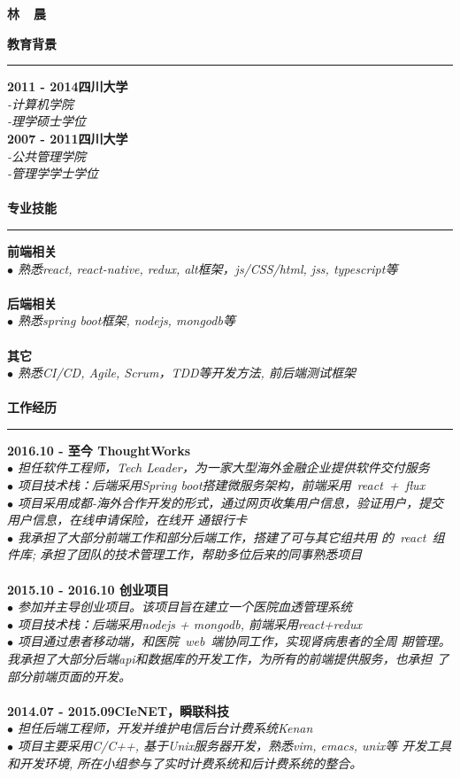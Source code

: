 \documentclass[a4paper,12pt,final]{memoir}
\newcommand{\myThemeColor}{RoyalBlue}
\newcommand{\SmallSep}{\vspace{0.9em}}
\newcommand{\CVSection}[1]
	{\Large\textbf{#1}\par
	\vspace{0.2cm}\normalsize\normalfont}
\newcommand{\CVItem}[1]
	{\textbf{\color{\myThemeColor} #1}}
\begin{document}
\begin{CJK*}{UTF8}{gbsn}
\Huge\bfseries {\color{\myThemeColor} 林~~晨}\\
\normalsize\normalfont

\CVSection{教育背景}
\hrule
\SmallSep
\CVItem{2011 - 2014\hfill\textsc{四川大学}}\\
\textit{-计算机学院}\\
\textit{-理学硕士学位}
\\
\CVItem{2007 - 2011\hfill\textsc{四川大学}}\\
\textit{-公共管理学院}\\
\textit{-管理学学士学位}\\
\\
\CVSection{专业技能}
\hrule
\SmallSep
\CVItem{前端相关}\\
\textit{$\bullet$ 熟悉react, react-native, redux, alt框架，js/CSS/html, jss, typescript等} \\
\\
\CVItem{后端相关}\\
\textit{$\bullet$ 熟悉spring boot框架, nodejs, mongodb等 } \\
\\
\CVItem{其它}\\
\textit{$\bullet$ 熟悉CI/CD, Agile, Scrum，TDD等开发方法, 前后端测试框架 }\\
\\

\CVSection{工作经历}
\hrule
\SmallSep
\CVItem{2016.10 - 至今 \hfill ThoughtWorks}\\
\textit{$\bullet$ 担任软件工程师，Tech Leader，为一家大型海外金融企业提供软件交付服务} \\
\textit{$\bullet$ 项目技术栈：后端采用Spring boot搭建微服务架构，前端采用~react~+~flux~} \\
\textit{$\bullet$ 项目采用成都-海外合作开发的形式，通过网页收集用户信息，验证用户，提交用户信息，在线申请保险，在线开
  通银行卡}\\
\textit{$\bullet$ 我承担了大部分前端工作和部分后端工作，搭建了可与其它组共用
  的~react~组件库; 承担了团队的技术管理工作，帮助多位后来的同事熟悉项目}\\
\\
\CVItem{2015.10 - 2016.10 \hfill 创业项目}\\
\textit{$\bullet$ 参加并主导创业项目。该项目旨在建立一个医院血透管理系统} \\
\textit{$\bullet$ 项目技术栈：后端采用nodejs + mongodb, 前端采用react+redux} \\
\textit{$\bullet$ 项目通过患者移动端，和医院~web~端协同工作，实现肾病患者的全周
  期管理。我承担了大部分后端api和数据库的开发工作，为所有的前端提供服务，也承担
  了部分前端页面的开发。}\\
\\
\CVItem{2014.07 - 2015.09\hfill CIeNET，瞬联科技}\\
\textit{$\bullet$ 担任后端工程师，开发并维护电信后台计费系统Kenan} \\
\textit{$\bullet$ 项目主要采用C/C++, 基于Unix服务器开发，熟悉vim, emacs, unix等
  开发工具和开发环境, 所在小组参与了实时计费系统和后计费系统的整合。} \\


\end{CJK*}
\end{document}
